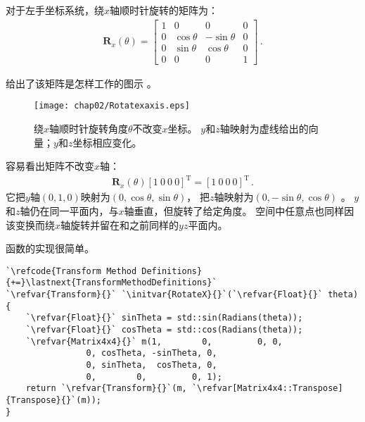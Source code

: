 对于左手坐标系统，绕$x$轴顺时针旋转的矩阵为：
\begin{align*}
    \bm R_x(\theta)=\left[
        \begin{array}{cccc}
            1 & 0          & 0           & 0 \\
            0 & \cos\theta & -\sin\theta & 0 \\
            0 & \sin\theta & \cos\theta  & 0 \\
            0 & 0          & 0           & 1
        \end{array}
        \right]\, .
\end{align*}

给出了该矩阵是怎样工作的图示
。
\begin{figure}[htbp]
    \centering\texttt{[image: chap02/Rotatexaxis.eps]}
    \caption{绕$x$轴顺时针旋转角度$\theta$不改变$x$坐标。
        $y$和$z$轴映射为虚线给出的向量；$y$和$z$坐标相应变化。}
    \label{fig:2.11}
\end{figure}

容易看出矩阵不改变$x$轴：
\begin{align*}
    \bm R_x(\theta)[1\ 0\ 0\ 0]^\mathrm{T}=[1\ 0\ 0\ 0]^\mathrm{T}\, .
\end{align*}
它把$y$轴$(0,1,0)$映射为$(0,\cos\theta,\sin\theta)$，
把$z$轴映射为$(0,-\sin\theta,\cos\theta)$
。
$y$和$z$轴仍在同一平面内，与$x$轴垂直，但旋转了给定角度。
空间中任意点也同样因该变换而绕$x$轴旋转并留在和之前同样的$yz$平面内。

函数的实现很简单。
\begin{lstlisting}
`\refcode{Transform Method Definitions}{+=}\lastnext{TransformMethodDefinitions}`
`\refvar{Transform}{}` `\initvar{RotateX}{}`(`\refvar{Float}{}` theta) {
    `\refvar{Float}{}` sinTheta = std::sin(Radians(theta));
    `\refvar{Float}{}` cosTheta = std::cos(Radians(theta));
    `\refvar{Matrix4x4}{}` m(1,        0,         0, 0, 
                0, cosTheta, -sinTheta, 0,
                0, sinTheta,  cosTheta, 0,
                0,        0,         0, 1);
    return `\refvar{Transform}{}`(m, `\refvar[Matrix4x4::Transpose]{Transpose}{}`(m));
}
\end{lstlisting}

